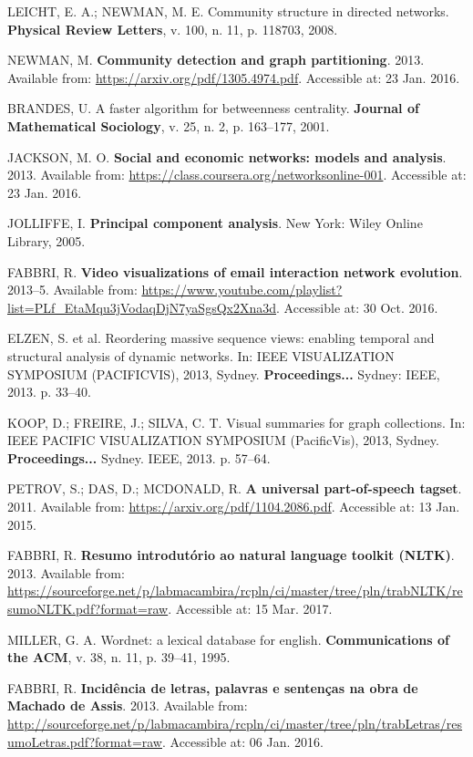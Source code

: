 \documentclass[
12pt,		%
openright,	%
twoside,  %
a4paper,			%
chapter=TITLE,		%
english,			%
french,				%
spanish,			%
brazil				%
]{USPSC}
\begin{document}
\begin{thebibliography}{999}
	LEICHT, E.  A.; NEWMAN, M. E. Community structure in directed networks. \textbf{Physical Review Letters}, v. 100, n. 11, p. 118703, 2008.

	NEWMAN, M. \textbf{Community detection and graph partitioning}.  2013. Available from: \url{https://arxiv.org/pdf/1305.4974.pdf}. Accessible at: 23 Jan. 2016.

	BRANDES, U. A faster algorithm for betweenness centrality. \textbf{Journal of Mathematical Sociology}, v. 25, n. 2, p. 163–177, 2001.

	JACKSON, M. O. \textbf{Social and economic networks: models and analysis}. 2013. Available from: \url{https://class.coursera.org/networksonline-001}. Accessible at:  23 Jan. 2016.

	JOLLIFFE, I. \textbf{Principal component analysis}. New York: Wiley Online Library, 2005.

	FABBRI, R. \textbf{Video visualizations of email interaction network evolution}. 2013–5. Available from: \url{https://www.youtube.com/playlist?list=PLf_EtaMqu3jVodaqDjN7yaSgsQx2Xna3d}. Accessible at: 30 Oct. 2016.

	ELZEN, S. et al. Reordering massive sequence views: enabling temporal and structural analysis of dynamic networks. In: IEEE VISUALIZATION SYMPOSIUM (PACIFICVIS), 2013, Sydney. \textbf{Proceedings...} Sydney: IEEE, 2013. p. 33–40.

	KOOP, D.; FREIRE, J.; SILVA, C. T. Visual summaries for graph collections. In: IEEE PACIFIC VISUALIZATION SYMPOSIUM (PacificVis), 2013, Sydney. \textbf{Proceedings...} Sydney. IEEE, 2013. p. 57–64.

	PETROV, S.; DAS, D.; MCDONALD, R. \textbf{A universal part-of-speech tagset}. 2011. Available from: \url{https://arxiv.org/pdf/1104.2086.pdf}. Accessible at: 13 Jan. 2015.

	FABBRI, R. \textbf{Resumo introdutório ao natural language toolkit (NLTK)}. 2013. Available from: \url{https://sourceforge.net/p/labmacambira/rcpln/ci/master/tree/pln/trabNLTK/resumoNLTK.pdf?format=raw}. Accessible at: 15 Mar. 2017.

	MILLER, G. A. Wordnet: a lexical database for english. \textbf{Communications of the ACM}, v. 38, n. 11, p. 39–41, 1995.

	FABBRI, R. \textbf{Incidência de letras, palavras e sentenças na obra de Machado de Assis}. 2013. Available from: \url{http://sourceforge.net/p/labmacambira/rcpln/ci/master/tree/pln/trabLetras/resumoLetras.pdf?format=raw}. Accessible at: 06 Jan. 2016.


\end{thebibliography}
\end{document}
